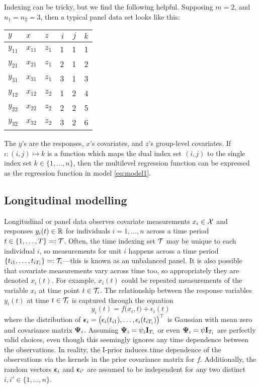 \begin{remark}
  \setlength{\parindent}{0em}
  Indexing can be tricky, but we find the following helpful.
  Supposing $m=2$, and $n_1 = n_2 = 3$, then a typical panel data set looks like this:
  \begin{table}[H]
  \centering
  \begin{tabular}{lllrrr}
  \hline
  $y$ & $x$  & $z$ & $i$ & $j$ & $k$ \\ 
  \hline
  $y_{11}$      & $x_{11}$    & $z_{1}$ &1&1& 1 \\
  $y_{21}$      & $x_{21}$    & $z_{1}$ &2&1& 2 \\
  $y_{31}$      & $x_{31}$    & $z_{1}$ &3&1& 3 \\
  $y_{12}$      & $x_{12}$    & $z_{2}$ &1&2& 4 \\
  $y_{22}$      & $x_{22}$    & $z_{2}$ &2&2& 5 \\
  $y_{32}$      & $x_{32}$    & $z_{2}$ &3&2& 6 \\  
  \hline
  \end{tabular}
  \end{table}
  \vspace{-1.5em}
  The $y$'s are the responses, $x$'s covariates, and $z$'s group-level covariates.
  If $\iota:(i,j)\mapsto k$ is a function which maps the dual index set $(i,j)$ to the single index set $k\in\{1,\dots,n\}$, then the multilevel regression function can be expressed as the regression function in model \cref{eq:model1}.
\end{remark}


\subsection{Longitudinal modelling}

Longitudinal or panel data observes covariate measurements $x_i\in{\mathcal X}$ and responses $y_i(t)\in\mathbb{R}$ for individuals $i=1,\dots,n$ across a time period $t \in \{1,\dots,T\} =: {\mathcal T}$. 
Often, the time indexing set ${\mathcal T}$ may be unique to each individual $i$, so measurements for unit $i$ happens across a time period $\{t_{i1},\dots,t_{iT_i} \} =: {\mathcal T}_i$---this is known as an unbalanced panel.
It is also possible that covariate measurements vary across time too, so appropriately they are denoted $x_i(t)$.
For example, $x_i(t)$ could be repeated measurements of the variable $x_i$ at time point $t\in{\mathcal T}_i$.
The relationship between the response variables $y_i(t)$ at time $t\in{\mathcal T}_i$ is captured through the equation
\[
  y_i(t) = f\big(x_i, t \big) + \epsilon_{i}(t)
\]
where the distribution of ${\bm\epsilon}_i = \big(\epsilon_i(t_{i1}),\dots,\epsilon_i(t_{iT_i}) \big)^\top$ is Gaussian with mean zero and covariance matrix ${\bm\Psi}_i$.
Assuming ${\bm\Psi}_i=\psi_i{\mathbf I}_{T_i}$ or even ${\bm\Psi}_i=\psi{\mathbf I}_{T_i}$ are perfectly valid choices, even though this seemingly ignores any time dependence between the observations.
In reality, the I-prior induces time dependence of the observations via the kernels in the prior covariance matrix for $f$.
Additionally, the random vectors ${\bm\epsilon}_i$ and ${\bm\epsilon}_{i'}$ are assumed to be independent for any two distinct $i,i'\in\{1,\dots,n\}$.

